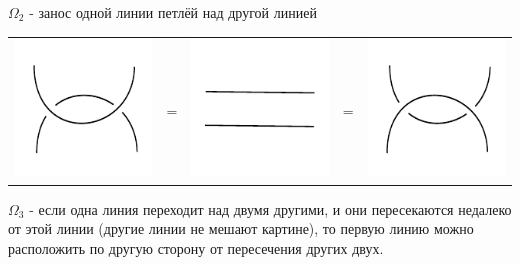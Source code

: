 $\Omega_2$ - занос одной линии петлёй над другой линией

\begin{tabular}{
>{\centering\arraybackslash}m{3cm}>{\centering\arraybackslash}m{0.4cm}
>{\centering\arraybackslash}m{3cm}>{\centering\arraybackslash}m{0.4cm}
>{\centering\arraybackslash}m{3cm}
}
\includegraphics{images/two-loops-up.pdf}
&
=
&
\includegraphics{images/two-line.pdf}
&
=
&
\includegraphics{images/two-loops-down.pdf}
\end{tabular}


$\Omega_3$ - если одна линия переходит над двумя другими, и они пересекаются недалеко от этой линии (другие линии не мешают картине), то первую линию можно расположить по другую сторону от пересечения других двух.

